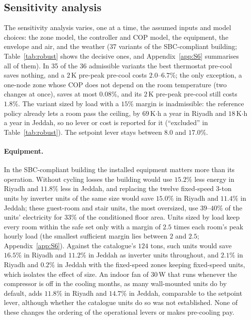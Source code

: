 \documentclass[10pt,a4paper,twocolumn]{article}
\theoremstyle{definition}
\begin{document}
\subsection{Sensitivity analysis}\label{sec:sensitivity}
The sensitivity analysis varies, one at a time, the assumed inputs and model choices: the zone model, the controller and COP model, the equipment, the envelope and air, and the weather (37 variants of the SBC-compliant building; Table~\ref{tab:robust} shows the decisive ones, and Appendix~\ref{app:S6} summarises all of them). In 35 of the 36 admissible variants the best thermostat pre-cool saves nothing, and a $2\,$K pre-peak pre-cool costs $2.0$--$6.7$\%; the only exception, a one-node zone whose COP does not depend on the room temperature (two changes at once), saves at most $0.08\%$, and its $2\,$K pre-peak pre-cool still costs $1.8\%$. The variant sized by load with a $15\%$ margin is inadmissible: the reference policy already lets a room pass the ceiling, by $69\,$K$\cdot$h a year in Riyadh and $18\,$K$\cdot$h a year in Jeddah, so no lever or cost is reported for it (``excluded'' in Table~\ref{tab:robust}). The setpoint lever stays between $8.0$ and $17.0\%$.

\paragraph{Equipment.} In the SBC-compliant building the installed equipment matters more than its operation. Without cycling losses the building would use $15.2\%$ less energy in Riyadh and $11.8\%$ less in Jeddah, and replacing the twelve fixed-speed 3-ton units by inverter units of the same size would save $15.0\%$ in Riyadh and $11.4\%$ in Jeddah; these guest-room and stair units, the most oversized, use $39$--$40$\% of the units' electricity for $33\%$ of the conditioned floor area. Units sized by load keep every room within the safe set only with a margin of $2.5$ times each room's peak hourly load (the smallest sufficient margin lies between $2$ and $2.5$; Appendix~\ref{app:S6}). Against the catalogue's $124$ tons, such units would save $16.5\%$ in Riyadh and $11.2\%$ in Jeddah as inverter units throughout, and $2.1\%$ in Riyadh and $0.2\%$ in Jeddah with the fixed-speed zones keeping fixed-speed units, which isolates the effect of size. An indoor fan of $30\,$W that runs whenever the compressor is off in the cooling months, as many wall-mounted units do by default, adds $11.8\%$ in Riyadh and $14.7\%$ in Jeddah, comparable to the setpoint lever, although whether the catalogue units do so was not established. None of these changes the ordering of the operational levers or makes pre-cooling pay.
\end{document}
